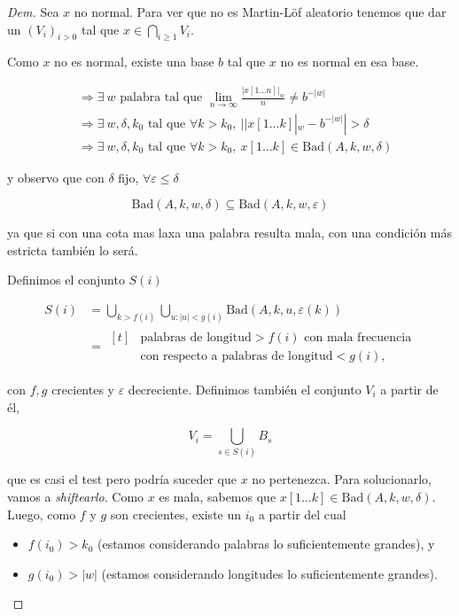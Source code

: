 \documentclass{article}
\theoremstyle{definition} %
\newcommand{\first}[2]{#2[1 \dots #1]}
\newcommand{\sucML}{(V_i)_{i > 0}}
\newcommand{\ML}{Martin-Löf }
\newcommand{\occurrencesOf}[2]{|#2|_#1}
\newcommand{\Bad}[4]{\text{Bad}(#1, #2, #3, #4)}
\begin{document}
\begin{proof}[Dem]
    Sea $x$ no normal. Para ver que no es \ML aleatorio tenemos que dar un
     $\sucML$ tal que $x \in \bigcap_{i \geq 1} V_i$.

    Como $x$ no es normal, existe una base $b$ tal que $x$ no es normal en esa
    base.

    \begin{align*}
        &\Rightarrow
            \exists\ w \text{ palabra tal que }
            \lim_{n\to\infty}
                \frac{\occurrencesOf{w}{\first{n}{x}}}{n}
            \neq b^{-|w|}\\
        &\Rightarrow
            \exists\ w, \delta, k_0 \text{ tal que }
                \forall k > k_0,\
                    |\occurrencesOf{w}{\first{k}{x}} - b^{-|w|}| > \delta\\
        &\Rightarrow
            \exists\ w, \delta, k_0 \text{ tal que }
            \forall k > k_0,\
                \first{k}{x} \in \Bad{A}{k}{w}{\delta}
    \end{align*}

    y observo que con $\delta$ fijo, $\forall \varepsilon \leq \delta$

    \[
        \Bad{A}{k}{w}{\delta} \subseteq \Bad{A}{k}{w}{\varepsilon}
    \]

    ya que si con una cota mas laxa una palabra resulta mala, con una condición
    más estricta también lo será.

    Definimos el conjunto $S(i)$

    \begin{align*}
        S(i)
            &= \bigcup_{k > f(i)} 
                \bigcup_{u : |u| < g(i)}
                    \Bad{A}{k}{u}{\varepsilon(k)}\\
            &=
                \begin{aligned}[t]
                &\text{palabras de longitud} > f(i)
                \text{ con mala frecuencia}\\
                &\text{con respecto a palabras de longitud} < g(i),
                \end{aligned}
    \end{align*}

    con $f, g$ crecientes y $\varepsilon$ decreciente. Definimos también el
    conjunto $V_i$ a partir de él,

    \[
        V_i = \bigcup_{s \in S(i)} B_s
    \]

    que es casi el test pero podría suceder que $x$ no pertenezca. Para
    solucionarlo, vamos a \textit{shiftearlo}. Como $x$ es mala, sabemos que
    $\first{k}{x} \in \Bad{A}{k}{w}{\delta}$. Luego, como $f$ y $g$ son
    crecientes, existe un $i_0$ a partir del cual
    \begin{itemize}
        \item $f(i_0) > k_0$ (estamos considerando palabras lo suficientemente
        grandes), y
        \item $g(i_0) > |w|$ (estamos considerando longitudes lo suficientemente
        grandes).
    \end{itemize}


\end{proof}
\end{document}
